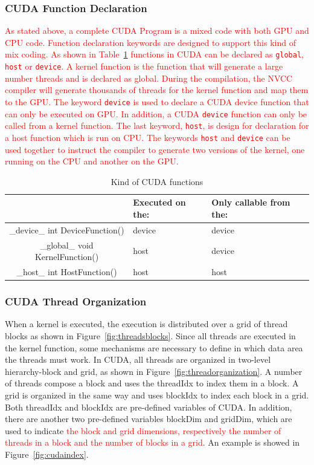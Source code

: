 \documentclass[Ingles]{ic-tese-v1}
\newcommand{\ed}[1]{\noindent\textcolor{red}{ {#1}}}
\newcommand{\ed}[1]{}
\newcommand{\rfig}[1]{Figure~\ref{fig:#1}}
\newcommand{\ttt}[1]{{\texttt{#1}}}
\begin{document}
\subsubsection{CUDA Function Declaration}
\label{CUDAfunction}

\ed{As stated above, a complete CUDA Program is a mixed code with both GPU and CPU
code. Function declaration keywords are designed to support this kind of mix
coding. As shown in Table~\ref{tab:cudaFunction} functions in CUDA can be
declared as \ttt{global}, \ttt{host} or \ttt{device}. A kernel function is the function that will
generate a large number threads and is declared as global. During the
compilation, the NVCC compiler will generate thousands of threads for the
kernel function and map them to the GPU. The keyword \ttt{device} is used to declare
a CUDA device function that can only be executed on GPU. In addition, a CUDA
\ttt{device} function can only be called from a kernel function. The last keyword,
\ttt{host}, is design for declaration for a host function which is run on CPU. The
keywords \ttt{host} and \ttt{device} can be used  together to instruct the compiler to
generate two versions of the kernel, one running on the CPU and another on the
GPU.}

\begin{table}[!t]
	\caption[small]{Kind of CUDA functions}
\begin{center}
	\begin{tabular}{ | c | >{\centering\arraybackslash}p{2cm} | >{\centering\arraybackslash}p{3cm} |}
		\hline
		 & Executed on the: & Only callable from the: \\ \hline
		{\color{blue} \_device\_} int DeviceFunction() & device & device \\ \hline
		{\color{blue} \_global\_} void KernelFunction()& host & device \\ \hline
		{\color{blue} \_host\_} int HostFunction() & host & host\\
		\hline
	\end{tabular}
\end{center}
\label{tab:cudaFunction}
\end{table}

\subsubsection{CUDA Thread Organization}
\label{CUDA Thread Organization}
When a kernel is executed, the execution is distributed over a grid of thread
blocks as shown in \rfig{threadsblocks}. Since all threads are executed in the
kernel function, some mechanisms are necessary to define in which data area the
threads must work. In CUDA, all threads are organized in two-level
hierarchy-block and grid, as shown in \rfig{threadorganization}. A number of
threads compose a block and uses the threadIdx to index them in a block. A grid
is organized in the same way and uses blockIdx to index each block in a grid.
Both threadIdx and blockIdx are pre-defined variables of CUDA. In addition,
there are another two pre-defined variables blockDim and gridDim, which are
used to indicate \ed{the block and grid dimensions, respectively the number of threads in a block
and the number of blocks in a grid}. An example is showed in \rfig{cudaindex}.
\end{document}
